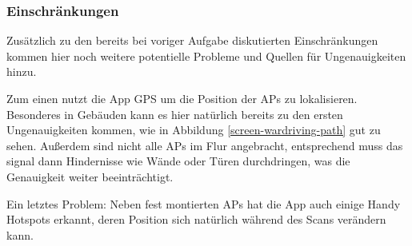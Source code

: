 \subsubsection{Einschränkungen}

Zusätzlich zu den bereits bei voriger Aufgabe diskutierten Einschränkungen kommen hier noch weitere potentielle Probleme und Quellen für Ungenauigkeiten hinzu.

Zum einen nutzt die App GPS um die Position der APs zu lokalisieren. Besonderes in Gebäuden kann es hier natürlich bereits zu den ersten Ungenauigkeiten kommen, wie in Abbildung \ref{screen-wardriving-path} gut zu sehen. Außerdem sind nicht alle APs im Flur angebracht, entsprechend muss das signal dann Hindernisse wie Wände oder Türen durchdringen, was die Genauigkeit weiter beeinträchtigt.

Ein letztes Problem: Neben fest montierten APs hat die App auch einige Handy Hotspots erkannt, deren Position sich natürlich während des Scans verändern kann.
